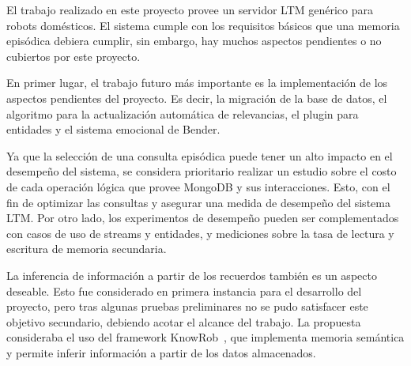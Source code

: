 \begin{conclusion}
El trabajo realizado en este proyecto provee un servidor LTM genérico para robots domésticos. El sistema cumple con los requisitos básicos que una memoria episódica debiera cumplir, sin embargo, hay muchos aspectos pendientes o no cubiertos por este proyecto.

En primer lugar, el trabajo futuro más importante es la implementación de los aspectos pendientes del proyecto. Es decir, la migración de la base de datos, el algoritmo para la actualización automática de relevancias, el plugin para entidades y el sistema emocional de Bender.

Ya que la selección de una consulta episódica puede tener un alto impacto en el desempeño del sistema, se considera prioritario realizar un estudio sobre el costo de cada operación lógica que provee MongoDB y sus interacciones. Esto, con el fin de optimizar las consultas y asegurar una medida de desempeño del sistema LTM. Por otro lado, los experimentos de desempeño pueden ser complementados con casos de uso de streams y entidades, y mediciones sobre la tasa de lectura y escritura de memoria secundaria.

La inferencia de información a partir de los recuerdos también es un aspecto deseable. Esto fue considerado en primera instancia para el desarrollo del proyecto, pero tras algunas pruebas preliminares no se pudo satisfacer este objetivo secundario, debiendo acotar el alcance del trabajo. La propuesta consideraba el uso del framework KnowRob~\cite{Winkler2014,Tenorth2013,Tenorth2009}, que implementa memoria semántica y permite inferir información a partir de los datos almacenados.



\end{conclusion}